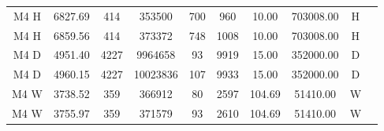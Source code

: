 \begin{table}[htb]
\begin{tabular}{c | c c c c c c c c c}
        \hline
        M4 H              & 6827.69        & 414              & 353500          & 700                & 960               & 10.00         & 703008.00     & H               \\
        M4 H              & 6859.56        & 414              & 373372          & 748                & 1008              & 10.00         & 703008.00     & H               \\
        \hline
        M4 D              & 4951.40        & 4227             & 9964658         & 93                 & 9919              & 15.00         & 352000.00     & D               \\
        M4 D              & 4960.15        & 4227             & 10023836        & 107                & 9933              & 15.00         & 352000.00     & D               \\
        \hline
        M4 W              & 3738.52        & 359              & 366912          & 80                 & 2597              & 104.69        & 51410.00      & W               \\
        M4 W              & 3755.97        & 359              & 371579          & 93                 & 2610              & 104.69        & 51410.00      & W               \\

\end{tabular}
\end{table}

